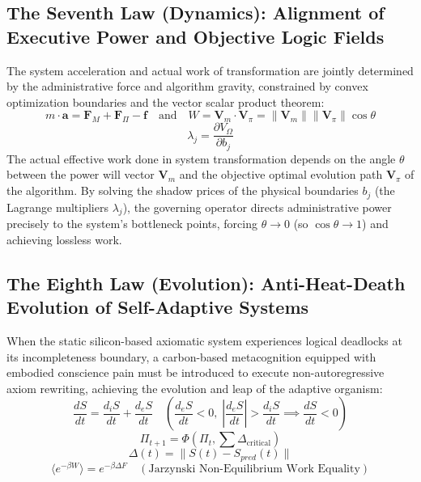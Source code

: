 \documentclass{article}
\begin{document}
\subsection*{The Seventh Law (Dynamics): Alignment of Executive Power and Objective Logic Fields}
The system acceleration and actual work of transformation are jointly determined by the administrative force and algorithm gravity, constrained by convex optimization boundaries and the vector scalar product theorem:
\begin{equation}
    m \cdot \mathbf{a} = \mathbf{F}_M + \mathbf{F}_{\Pi} - \mathbf{f} \quad \text{and} \quad W = \mathbf{V}_m \cdot \mathbf{V}_{\pi} = \|\mathbf{V}_m\| \|\mathbf{V}_{\pi}\| \cos \theta
\end{equation}
\begin{equation}
    \lambda_j = \frac{\partial V_{\Omega}}{\partial b_j}
\end{equation}
The actual effective work done in system transformation depends on the angle $\theta$ between the power will vector $\mathbf{V}_m$ and the objective optimal evolution path $\mathbf{V}_{\pi}$ of the algorithm. By solving the shadow prices of the physical boundaries $b_j$ (the Lagrange multipliers $\lambda_j$), the governing operator directs administrative power precisely to the system's bottleneck points, forcing $\theta \to 0$ (so $\cos\theta \to 1$) and achieving lossless work.

\subsection*{The Eighth Law (Evolution): Anti-Heat-Death Evolution of Self-Adaptive Systems}
When the static silicon-based axiomatic system experiences logical deadlocks at its incompleteness boundary, a carbon-based metacognition equipped with embodied conscience pain must be introduced to execute non-autoregressive axiom rewriting, achieving the evolution and leap of the adaptive organism:
\begin{equation}
    \frac{dS}{dt} = \frac{d_iS}{dt} + \frac{d_eS}{dt} \quad \left( \frac{d_eS}{dt} < 0, \; \left|\frac{d_eS}{dt}\right| > \frac{d_iS}{dt} \implies \frac{dS}{dt} < 0 \right)
\end{equation}
\begin{equation}\label{evolution-phi}
    \Pi_{t+1} = \Phi\left(\Pi_t, \sum \Delta_{\text{critical}}\right)
\end{equation}
\begin{equation}
    \Delta(t) = \|S(t) - S_{pred}(t)\|
\end{equation}
\begin{equation}
    \langle e^{-\beta W} \rangle = e^{-\beta \Delta F} \quad (\text{Jarzynski Non-Equilibrium Work Equality})
\end{equation}
\end{document}
